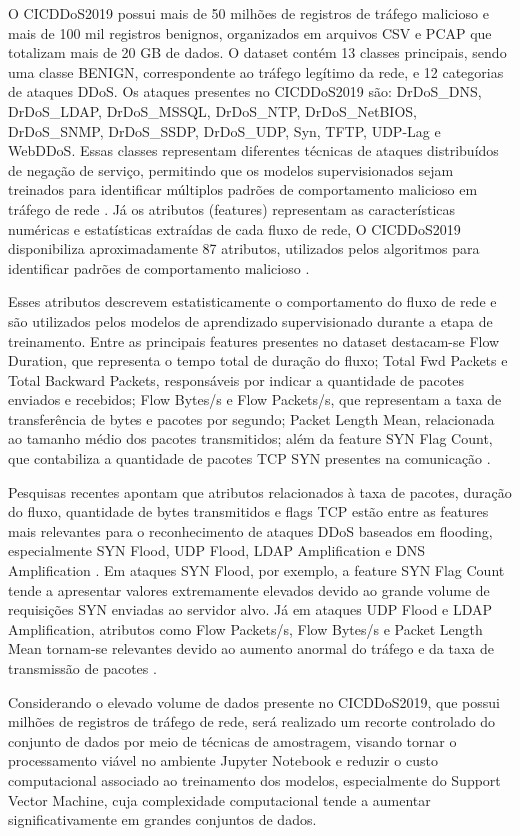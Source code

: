 \documentclass[
    12pt,                %
    openright,           %
    oneside,             %
    a4paper,             %
    english,             %
    brazil               %
]{abntex2}
\begin{document}
O CICDDoS2019 possui mais de 50 milhões de registros de tráfego malicioso e mais de 100 mil registros benignos, organizados em arquivos CSV e PCAP que totalizam mais de 20 GB de dados. O dataset contém 13 classes principais, sendo uma classe BENIGN, correspondente ao tráfego legítimo da rede, e 12 categorias de ataques DDoS. Os ataques presentes no CICDDoS2019 são: DrDoS\_DNS, DrDoS\_LDAP, DrDoS\_MSSQL, DrDoS\_NTP, DrDoS\_NetBIOS, DrDoS\_SNMP, DrDoS\_SSDP, DrDoS\_UDP, Syn, TFTP, UDP-Lag e WebDDoS. Essas classes representam diferentes técnicas de ataques distribuídos de negação de serviço, permitindo que os modelos supervisionados sejam treinados para identificar múltiplos padrões de comportamento malicioso em tráfego de rede \cite{Salih2024}. Já os atributos (features) representam as características numéricas e estatísticas extraídas de cada fluxo de rede, O CICDDoS2019 disponibiliza aproximadamente 87 atributos, utilizados pelos algoritmos para identificar padrões de comportamento malicioso \cite{Salih2024}. 

Esses atributos descrevem estatisticamente o comportamento do fluxo de rede e são utilizados pelos modelos de aprendizado supervisionado durante a etapa de treinamento. Entre as principais features presentes no dataset destacam-se Flow Duration, que representa o tempo total de duração do fluxo; Total Fwd Packets e Total Backward Packets, responsáveis por indicar a quantidade de pacotes enviados e recebidos; Flow Bytes/s e Flow Packets/s, que representam a taxa de transferência de bytes e pacotes por segundo; Packet Length Mean, relacionada ao tamanho médio dos pacotes transmitidos; além da feature SYN Flag Count, que contabiliza a quantidade de pacotes TCP SYN presentes na comunicação \cite{Salih2024}. 

Pesquisas recentes apontam que atributos relacionados à taxa de pacotes, duração do fluxo, quantidade de bytes transmitidos e flags TCP estão entre as features mais relevantes para o reconhecimento de ataques DDoS baseados em flooding, especialmente SYN Flood, UDP Flood, LDAP Amplification e DNS Amplification \cite{Salih2024}. Em ataques SYN Flood, por exemplo, a feature SYN Flag Count tende a apresentar valores extremamente elevados devido ao grande volume de requisições SYN enviadas ao servidor alvo. Já em ataques UDP Flood e LDAP Amplification, atributos como Flow Packets/s, Flow Bytes/s e Packet Length Mean tornam-se relevantes devido ao aumento anormal do tráfego e da taxa de transmissão de pacotes \cite{Salih2024}. 

Considerando o elevado volume de dados presente no CICDDoS2019, que possui milhões de registros de tráfego de rede, será realizado um recorte controlado do conjunto de dados por meio de técnicas de amostragem, visando tornar o processamento viável no ambiente Jupyter Notebook e reduzir o custo computacional associado ao treinamento dos modelos, especialmente do Support Vector Machine, cuja complexidade computacional tende a aumentar significativamente em grandes conjuntos de dados.
\end{document}
